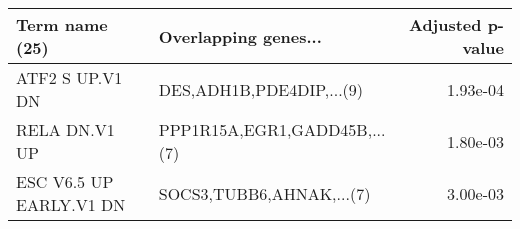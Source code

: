 \begin{tabular}{llr}
\toprule
         Term name (25) &         Overlapping genes... &  Adjusted p-value \\
\midrule
        ATF2 S UP.V1 DN &     DES,ADH1B,PDE4DIP,...(9) &          1.93e-04 \\
          RELA DN.V1 UP & PPP1R15A,EGR1,GADD45B,...(7) &          1.80e-03 \\
ESC V6.5 UP EARLY.V1 DN &     SOCS3,TUBB6,AHNAK,...(7) &          3.00e-03 \\
\bottomrule
\end{tabular}
